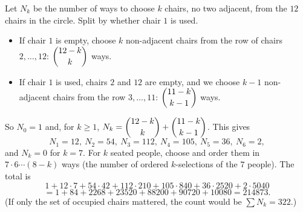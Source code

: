 Let $N_k$ be the number of ways to choose $k$ chairs, no two adjacent, from the $12$ chairs in the circle. Split by whether chair $1$ is used.
\begin{itemize}
\item If chair $1$ is empty, choose $k$ non-adjacent chairs from the row of chairs $2,\dots,12$: $\dbinom{12-k}{k}$ ways.
\item If chair $1$ is used, chairs $2$ and $12$ are empty, and we choose $k-1$ non-adjacent chairs from the row $3,\dots,11$: $\dbinom{11-k}{k-1}$ ways.
\end{itemize}
So $N_0=1$ and, for $k\ge1$, $N_k=\dbinom{12-k}{k}+\dbinom{11-k}{k-1}$. This gives
\[N_1=12,\ N_2=54,\ N_3=112,\ N_4=105,\ N_5=36,\ N_6=2,\]
and $N_k=0$ for $k=7$. For $k$ seated people, choose and order them in $7\cdot6\cdots(8-k)$ ways (the number of ordered $k$-selections of the $7$ people). The total is
\[1+12\cdot7+54\cdot42+112\cdot210+105\cdot840+36\cdot2520+2\cdot5040\]
\[=1+84+2268+23520+88200+90720+10080=\boxed{214873}.\]
(If only the set of occupied chairs mattered, the count would be $\sum N_k=322$.)

